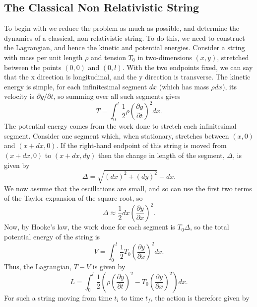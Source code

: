 \documentclass[a4paper,12pt]{article}
\numberwithin{equation}{section}
\begin{document}
\subsection{The Classical Non Relativistic String}\label{nonrelativistic}
To begin with we reduce the problem as much as possible, and determine the dynamics of a classical, non-relativistic string. To do this, we need to construct the Lagrangian, and hence the kinetic and potential energies. Consider a string with mass per unit length $\rho$ and tension $T_0$ in two-dimensions $(x,y)$, stretched between the points $(0,0)$ and $(0,l)$. With the two endpoints fixed, we can say that the x direction is longitudinal, and the y direction is transverse. The kinetic energy is simple, for each infinitesimal segment $dx$ (which has mass $\rho dx$), its velocity is $\partial y/ \partial t$, so summing over all such segments gives 
\begin{equation}\label{nrkinetic}
T =  \int_0^l \frac{1}{2}  \rho  \left( \frac{\partial y}{\partial t} \right)^2 dx.
\end{equation}
The potential energy comes from the work done to stretch each infinitesimal segment. Consider one segment which, when stationary, stretches between $(x,0)$ and $(x + dx, 0)$. If the right-hand endpoint of this string is moved from $(x+dx, 0)$ to $(x+dx, dy)$ then the change in length of the segment, $\Delta$, is given by 
\begin{equation}
\Delta = \sqrt{(dx)^2 + (dy)^2} - dx.
\end{equation} 
We now assume that the oscillations are small, and so can use the first two terms of the Taylor expansion of the square root, so
\begin{equation}
\Delta \approx \frac{1}{2}dx \left( \frac{\partial y}{\partial x} \right)^2.
\end{equation}
Now, by Hooke's law, the work done for each segment is $T_0 \Delta$, so the total potential energy of the string is 
\begin{equation}
V = \int_0^l \frac{1}{2} T_0 \left( \frac{\partial y}{\partial x} \right) ^2 dx.
\end{equation} 
Thus, the Lagrangian, $T - V$ is given by 
\begin{equation}
L = \int_0^l \frac{1}{2}\left( \rho  \left( \frac{\partial y}{\partial t} \right)^2 -  T_0 \left( \frac{\partial y}{\partial x} \right) ^2 \right) dx.
\end{equation}
For such a string moving from time $t_i$ to time $t_f$, the action is therefore given by 
\end{document}
